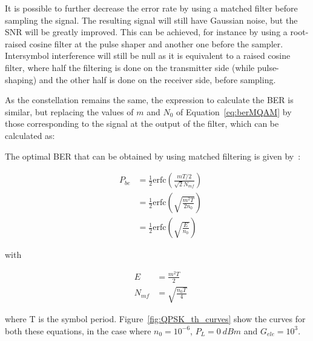 
It is possible to further decrease the error rate by using a matched filter before sampling the signal. The resulting signal will still have Gaussian noise, but the SNR will be greatly improved. This can be achieved, for instance by using a root-raised cosine filter at the pulse shaper and another one before the sampler. Intersymbol interference will still be null as it is equivalent to a raised cosine filter, where half the filtering is done on the transmitter side (while pulse-shaping) and the other half is done on the receiver side, before sampling.

As the constellation remains the same, the expression to calculate the BER is similar, but replacing the values of $m$ and $N_0$ of Equation~\eqref{eq:berMQAM} by those corresponding to the signal at the output of the filter, which can be calculated as:


The optimal BER that can be obtained by using matched filtering is given by~\cite{mischasch}:

\begin{eqnarray}\label{eq:berBPSK}
&P_{be} &= \frac{1}{2} \text{erfc}\left({\frac{mT/2}{\sqrt{2} N_{mf}}}\right)\\
&	    &= \frac{1}{2} \text{erfc}\left(\sqrt{{\frac{m^2T}{2 n_0}}}\right)\\
&	    &= \frac{1}{2} \text{erfc}\left(\sqrt{{\frac{E}{n_0}}}\right)
\end{eqnarray}

with

\begin{eqnarray}
&E &= \frac{m^2 T}{2} \\
&N_{mf} &= \sqrt{\frac{n_0 T}{4}}
\end{eqnarray}

\noindent where T is the symbol period.
Figure~\ref{fig:QPSK_th_curves} show the curves for both these equations, in the case where  $n_0=10^{-6}$, $P_L = 0~dBm$ and $G_{ele} = 10^3$.


